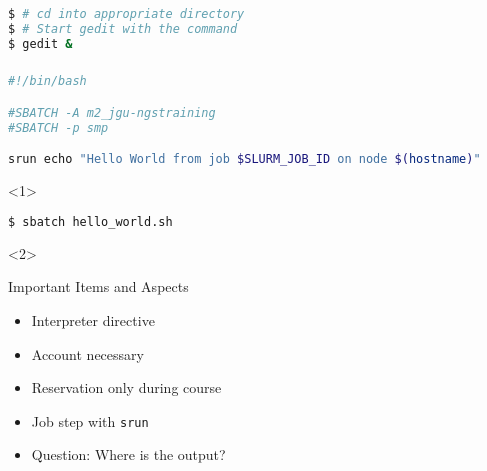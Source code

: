 \setcounter{preframe_handson}{\value{handson}}

\begin{frame}[fragile]
  \setcounter{handson}{\value{preframe_handson}}
  \frametitle{}
  \begin{lstlisting}[language=Bash, style=Shell, basicstyle=\scriptsize]
$ # cd into appropriate directory
$ # Start gedit with the command 
$ gedit &
  \end{lstlisting}
\end{frame}

\begin{frame}[fragile]
  \setcounter{handson}{\value{preframe_handson}}
  \frametitle{}
  \vspace{-2em}
  \begin{minipage}[t][0.32\textheight][t]{1.0\linewidth}
  \begin{lstlisting}[language=Bash, style=Shell, basicstyle=\scriptsize]
#!/bin/bash

#SBATCH -A m2_jgu-ngstraining
#SBATCH -p smp

srun echo "Hello World from job $SLURM_JOB_ID on node $(hostname)"
\end{lstlisting}
\end{minipage}\newline
\begin{minipage}[t][0.3\textheight][t]{1.0\linewidth}
  \begin{onlyenv}<1>
    \begin{lstlisting}[language=Bash, style=Shell, basicstyle=\footnotesize]
$ sbatch hello_world.sh
\end{lstlisting}
\end{onlyenv}
\begin{onlyenv}<2>
\begin{block}{Important Items and Aspects}
  \begin{itemize}
  \item Interpreter directive
  \item Account necessary
  \item Reservation only during course
  \item Job step with \texttt{srun}
  \item Question: Where is the output?
  \end{itemize}
\end{block}
\end{onlyenv}
\end{minipage}
\vfill
\end{frame}


